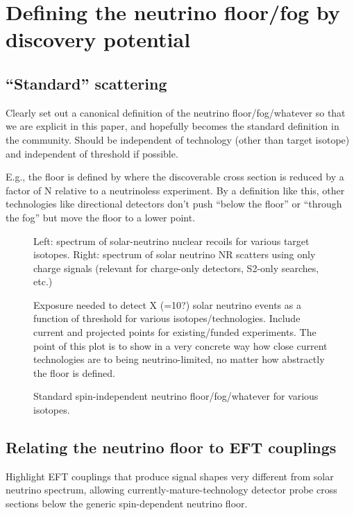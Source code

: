 \section{Defining the neutrino floor/fog by discovery potential}
\label{sec:neutrinofloor}

\subsection{``Standard'' scattering}
Clearly set out a canonical definition of the neutrino floor/fog/whatever so that we are explicit in this paper, and hopefully becomes the standard definition in the community. Should be independent of technology (other than target isotope) and independent of threshold if possible. 

E.g., the floor is defined by where the discoverable cross section is reduced by a factor of N relative to a neutrinoless experiment. By a definition like this, other technologies like directional detectors don't push ``below the floor'' or ``through the fog'' but move the floor to a lower point. 

\begin{figure}
    \centering
    \caption{Left: spectrum of solar-neutrino nuclear recoils for various target isotopes. Right: spectrum of solar neutrino NR scatters using only charge signals (relevant for charge-only detectors, S2-only searches, etc.) }
    \label{fig:coherent_solarnu_rates}
\end{figure}

\begin{figure}
    \centering
    \caption{Exposure needed to detect X (=10?) solar neutrino events as a function of threshold for various isotopes/technologies. Include current and projected points for existing/funded experiments. The point of this plot is to show in a very concrete way how close current technologies are to being neutrino-limited, no matter how abstractly the floor is defined.}
    \label{fig:solarnu_exposure}
\end{figure}

\begin{figure}
    \centering
    \caption{Standard spin-independent neutrino floor/fog/whatever for various isotopes.}
    \label{fig:neutrino_floor}
\end{figure}


\subsection{Relating the neutrino floor to EFT couplings}
Highlight EFT couplings that produce signal shapes very different from solar neutrino spectrum, allowing currently-mature-technology detector probe cross sections below the generic spin-dependent neutrino floor. 
